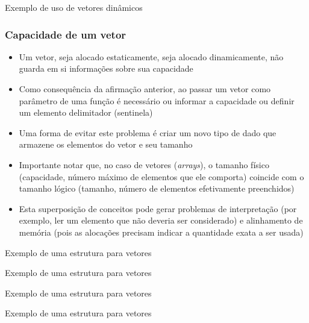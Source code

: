 \begin{frame}[fragile]{Exemplo de uso de vetores dinâmicos}
\end{frame}

\begin{frame}

	\frametitle{Capacidade de um vetor}

	\begin{itemize}

		\item Um vetor, seja alocado estaticamente, seja alocado 
		dinamicamente, {não guarda} em si informações sobre sua capacidade

		\item Como consequência da afirmação anterior, ao passar um 
		vetor como parâmetro de uma função é necessário ou 
		{informar} a capacidade ou {definir} um elemento delimitador (sentinela)

		\item Uma forma de evitar este problema é criar um 
		{novo tipo de dado} que armazene os elementos do vetor e seu tamanho

        \item Importante notar que, no caso de vetores (\textit{arrays}), o tamanho físico
        (capacidade, número máximo de elementos que ele comporta) coincide com o tamanho lógico
        (tamanho, número de elementos efetivamente preenchidos)

        \item Esta superposição de conceitos pode gerar problemas de interpretação (por exemplo,
            ler um elemento que não deveria ser considerado) e alinhamento de memória (pois as
            alocações precisam indicar a quantidade exata a ser usada)
	\end{itemize}

\end{frame}

\begin{frame}[fragile]{Exemplo de uma estrutura para vetores}
\end{frame}

\begin{frame}[fragile]{Exemplo de uma estrutura para vetores}
\end{frame}

\begin{frame}[fragile]{Exemplo de uma estrutura para vetores}
\end{frame}

\begin{frame}[fragile]{Exemplo de uma estrutura para vetores}
\end{frame}
